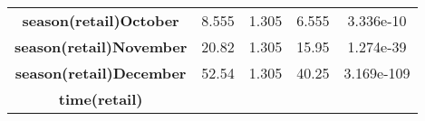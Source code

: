 \documentclass[]{book}
\theoremstyle{definition}
\theoremstyle{definition}
\theoremstyle{remark}
\begin{document}
\begin{longtable}[c]{@{}ccccc@{}}
\begin{minipage}[t]{0.35\columnwidth}
\textbf{season(retail)October}
\strut\end{minipage} &
\begin{minipage}[t]{0.13\columnwidth}\centering\strut
8.555
\strut\end{minipage} &
\begin{minipage}[t]{0.15\columnwidth}\centering\strut
1.305
\strut\end{minipage} &
\begin{minipage}[t]{0.12\columnwidth}\centering\strut
6.555
\strut\end{minipage} &
\begin{minipage}[t]{0.12\columnwidth}\centering\strut
3.336e-10
\strut\end{minipage}\tabularnewline
\begin{minipage}[t]{0.35\columnwidth}\centering\strut
\textbf{season(retail)November}
\strut\end{minipage} &
\begin{minipage}[t]{0.13\columnwidth}\centering\strut
20.82
\strut\end{minipage} &
\begin{minipage}[t]{0.15\columnwidth}\centering\strut
1.305
\strut\end{minipage} &
\begin{minipage}[t]{0.12\columnwidth}\centering\strut
15.95
\strut\end{minipage} &
\begin{minipage}[t]{0.12\columnwidth}\centering\strut
1.274e-39
\strut\end{minipage}\tabularnewline
\begin{minipage}[t]{0.35\columnwidth}\centering\strut
\textbf{season(retail)December}
\strut\end{minipage} &
\begin{minipage}[t]{0.13\columnwidth}\centering\strut
52.54
\strut\end{minipage} &
\begin{minipage}[t]{0.15\columnwidth}\centering\strut
1.305
\strut\end{minipage} &
\begin{minipage}[t]{0.12\columnwidth}\centering\strut
40.25
\strut\end{minipage} &
\begin{minipage}[t]{0.12\columnwidth}\centering\strut
3.169e-109
\strut\end{minipage}\tabularnewline
\begin{minipage}[t]{0.35\columnwidth}\centering\strut
\textbf{time(retail)}
\strut\end{minipage} &

\end{longtable}
\end{document}
